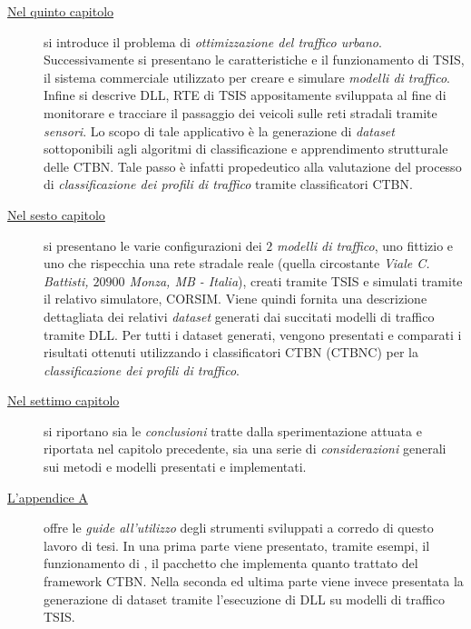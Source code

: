 \begin{description}
	\item[{\hyperref[cap:tsis-sensors]{Nel quinto capitolo}}]
	si introduce il problema di \emph{ottimizzazione del traffico urbano}. Successivamente si presentano le caratteristiche e il funzionamento di \acf{TSIS}, il sistema commerciale utilizzato per creare e simulare \emph{modelli di traffico}. Infine si descrive  \acs{DLL}, \acl{RTE} di \acs{TSIS} appositamente sviluppata al fine di monitorare e tracciare il passaggio dei veicoli sulle reti stradali tramite \emph{sensori}. Lo scopo di tale applicativo è la generazione di \emph{dataset} sottoponibili agli algoritmi di classificazione e apprendimento strutturale delle \acs{CTBN}. Tale passo è infatti propedeutico alla valutazione del processo di \emph{classificazione dei profili di traffico} tramite classificatori \acs{CTBN}.
	\item[{\hyperref[cap:esperimenti]{Nel sesto capitolo}}]
	si presentano le varie configurazioni dei $2$ \emph{modelli di traffico}, uno fittizio e uno che rispecchia una rete stradale reale (quella circostante \emph{Viale C. Battisti, $20900$ Monza, MB - Italia}), creati tramite \acs{TSIS} e simulati tramite il relativo simulatore, \acs{CORSIM}. Viene quindi fornita una descrizione dettagliata dei relativi \emph{dataset} generati dai succitati modelli di traffico tramite  \acs{DLL}. Per tutti i dataset generati, vengono presentati e comparati i risultati ottenuti utilizzando i classificatori \acs{CTBN} (\acs{CTBNC}) per la \emph{classificazione dei profili di traffico}.
	\item[{\hyperref[cap:concl]{Nel settimo capitolo}}]
	si riportano sia le \emph{conclusioni} tratte dalla sperimentazione attuata e riportata nel capitolo precedente, sia una serie di \emph{considerazioni} generali sui metodi e modelli presentati e implementati.
	\item[{\hyperref[cap:guide]{L'appendice A}}]
	offre le \emph{guide all'utilizzo} degli strumenti sviluppati a corredo di questo lavoro di tesi. In una prima parte viene presentato, tramite esempi, il funzionamento di \rctbn{}, il pacchetto  che implementa quanto trattato del framework \acs{CTBN}. Nella seconda ed ultima parte viene invece presentata la generazione di dataset tramite l'esecuzione di  \acs{DLL} su modelli di traffico \acs{TSIS}.
\end{description}

